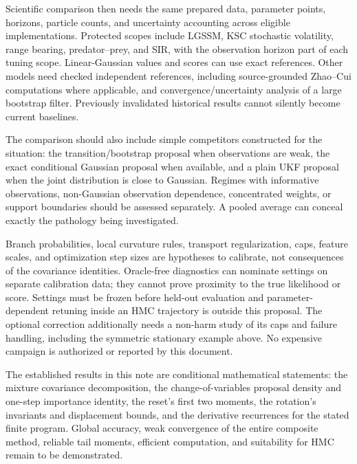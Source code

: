 \documentclass[11pt,a4paper]{article}
\begin{document}
Scientific comparison then needs the same prepared data, parameter points,
horizons, particle counts, and uncertainty accounting across eligible
implementations. Protected scopes include LGSSM, KSC stochastic volatility,
range bearing, predator--prey, and SIR, with the observation horizon part of
each tuning scope. Linear-Gaussian values and scores can use exact references.
Other models need checked independent references, including source-grounded
Zhao--Cui computations where applicable, and convergence/uncertainty analysis
of a large bootstrap filter. Previously invalidated historical results
cannot silently become current baselines.

The comparison should also include simple competitors constructed for
the situation: the transition/bootstrap proposal when observations are
weak, the exact conditional Gaussian proposal when available, and a plain
UKF proposal when the joint distribution is close to Gaussian.
Regimes with informative observations, non-Gaussian observation dependence,
concentrated weights, or support boundaries should be assessed separately.
A pooled average can conceal exactly the pathology being investigated.

Branch probabilities, local curvature rules, transport regularization,
caps, feature scales, and optimization step sizes are hypotheses to
calibrate, not consequences of the covariance identities.
Oracle-free diagnostics can nominate settings on separate calibration data;
they cannot prove proximity to the true likelihood or score.
Settings must be frozen before held-out evaluation and parameter-dependent
retuning inside an HMC trajectory is outside this proposal.
The optional correction additionally needs a non-harm study of its caps
and failure handling, including the symmetric stationary example above.
No expensive campaign is authorized or reported by this document.

The established results in this note are conditional mathematical statements:
the mixture covariance decomposition, the change-of-variables proposal
density and one-step importance identity, the reset's first two moments,
the rotation's invariants and displacement bounds, and the derivative
recurrences for the stated finite program. Global accuracy, weak convergence
of the entire composite method, reliable tail moments, efficient computation,
and suitability for HMC remain to be demonstrated.
\end{document}
